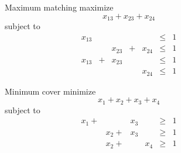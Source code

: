 \documentclass[hyperref={pdfpagelabels=false}]{beamer}
\begin{document}
{	\begin{center}
	\begin{figure}[h]
		\hfill
		\centering
		\begin{minipage}[c]{.45\textwidth}
		\centering
		\begin{block}{Maximum matching}
		maximize
		\begin{equation*}
		x_{13} + x_{23} + x_{24}
		\end{equation*}
		subject to
		\begin{equation*}
		\begin{array}{ccccccc}
	  	x_{13} &   &        &   &        & \leq & 1\\
		       &   & x_{23} & + & x_{24} & \leq & 1\\
		x_{13} & + & x_{23} &   &        & \leq & 1\\
		       &   &        &   & x_{24} & \leq & 1
	  	\end{array}
	  	\end{equation*}
		\end{block}
		\end{minipage}
		\hfill
		\centering
		\begin{minipage}[c]{.45\textwidth}
		\centering
		\begin{block}{Minimum cover}
		minimize
		\begin{equation*}
		x_{1} + x_{2} + x_{3} + x_{4}
		\end{equation*}
		subject to
		\begin{equation*}
		\begin{array}{cccccccc}
	  	x_{1}+ &        & x_{3} &       & \geq & 1\\
		       & x_{2}+ & x_{3} &       & \geq & 1\\
		       & x_{2}+ &       & x_{4} & \geq & 1\\
		       &        &       &       &      &  \\
	  	\end{array}
	  	\end{equation*}
		\end{block}
		\end{minipage}
		\hfill
	\end{figure}
	\end{center}
}
\end{document}
